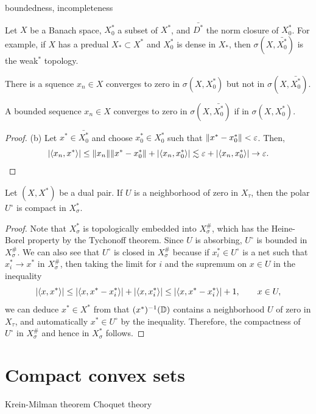 \documentclass{../../large}
\begin{document}
boundedness, incompleteness



\begin{prb}
Let $X$ be a Banach space, $X_0^*$ a subset of $X^*$, and $\bar{D^*}$ the norm closure of $X_0^*$.
For example, if $X$ has a predual $X_*\subset X^*$ and $X_0^*$ is dense in $X_*$, then $\sigma(X,\bar{X_0^*})$ is the weak$^*$ topology.
\begin{parts}
\item There is a squence $x_n\in X$ converges to zero in $\sigma(X,X_0^*)$ but not in $\sigma(X,\bar{X_0^*})$.
\item A bounded sequence $x_n\in X$ converges to zero in $\sigma(X,\bar{X_0^*})$ if in $\sigma(X,X_0^*)$.
\end{parts}
\end{prb}
\begin{proof}
(b)
Let $x^*\in\bar{X_0^*}$ and choose $x_0^*\in X_0^*$ such that $\|x^*-x_0^*\|<\varepsilon$.
Then,
\[|\langle x_n,x^*\rangle|\le\|x_n\|\|x^*-x_0^*\|+|\langle x_n,x_0^*\rangle|\lesssim\varepsilon+|\langle x_n,x_0^*\rangle|\to\varepsilon.\]
\end{proof}



\begin{prb}
Let $(X,X^*)$ be a dual pair.
If $U$ is a neighborhood of zero in $X_\tau$, then the polar $U^\circ$ is compact in $X^*_\sigma$.
\end{prb}
\begin{proof}
Note that $X^*_\sigma$ is topologically embedded into $X^\#_\sigma$, which has the Heine-Borel property by the Tychonoff theorem.
Since $U$ is absorbing, $U^\circ$ is bounded in $X^\#_\sigma$.
We can also see that $U^\circ$ is closed in $X^\#_\sigma$ because if $x_i^*\in U^\circ$ is a net such that $x_i^*\to x^*$ in $X^\#_\sigma$, then taking the limit for $i$ and the supremum on $x\in U$ in the inequality
\[|\langle x,x^*\rangle|\le|\langle x,x^*-x^*_i\rangle|+|\langle x,x_i^*\rangle|\le|\langle x,x^*-x^*_i\rangle|+1,\qquad x\in U,\]
we can deduce $x^*\in X^*$ from that $(x^*)^{-1}(\mathbb{D})$ contains a neighborhood $U$ of zero in $X_\tau$, and automatically $x^*\in U^\circ$ by the inequality.
Therefore, the compactness of $U^\circ$ in $X_\sigma^\#$ and hence in $X_\sigma^*$ follows.
\end{proof}




\section{Compact convex sets}
Krein-Milman theorem
Choquet theory
\end{document}

